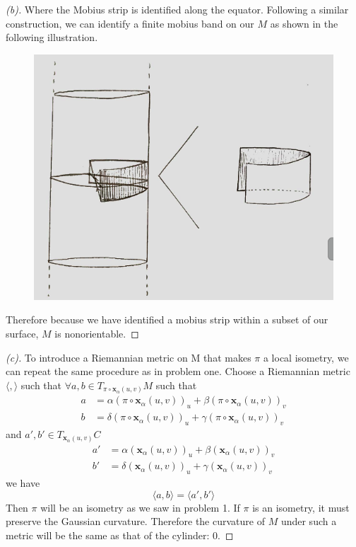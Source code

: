 \documentclass[a4paper, 11pt]{article}
\begin{document}
\begin{proof}[(b)]
			\noindent Where the Mobius strip is identified along the equator. Following a similar construction, we can identify a finite mobius band on our $M$ as shown in the following illustration. 
				\begin{figure}[!hbt]
					\centering
					\includegraphics[width=0.45\columnwidth]{mobiusBand_cylinderAntipodal}
				\end{figure}
			Therefore because we have identified a mobius strip within a subset of our surface, $M$ is nonorientable. 
		\end{proof}

		\begin{proof}[(c)]
			To introduce a Riemannian metric on M that makes $\pi$ a local isometry, we can repeat the same procedure as in problem one. Choose a Riemannian metric $\langle , \rangle$ such that $\forall a,b \in T_{\pi \circ \mathbf{x}_\alpha(u,v)}M$ 
			such that 
				\begin{align*}
					a &= \alpha(\pi\circ\mathbf{x}_\alpha(u,v))_u + \beta(\pi\circ\mathbf{x}_\alpha(u,v))_v \\ 
					b &= \delta(\pi\circ\mathbf{x}_\alpha(u,v))_u + \gamma(\pi\circ\mathbf{x}_\alpha(u,v))_v
				\end{align*}
			and $a',b' \in T_{\mathbf{x}_\alpha(u,v)}C$ 
				\begin{align*}
					a' &= \alpha(\mathbf{x}_\alpha(u,v))_u + \beta(\mathbf{x}_\alpha(u,v))_v \\ 
					b' &= \delta(\mathbf{x}_\alpha(u,v))_u + \gamma(\mathbf{x}_\alpha(u,v))_v
				\end{align*}
			we have 
				\begin{equation*}
					\langle a, b \rangle = \langle a', b' \rangle 
				\end{equation*}
			Then $\pi$ will be an isometry as we saw in problem 1. If $\pi$ is an isometry, it must preserve the Gaussian curvature. Therefore the curvature of $M$ under such a metric will be the same as that of the cylinder: 0. 
		\end{proof}
\end{document}
